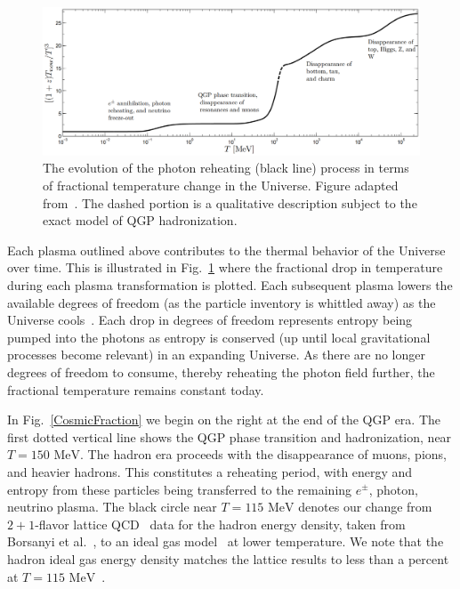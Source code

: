 \documentclass[universe,article,submit,moreauthors,pdftex,a4paper]{Definitions/mdpi}
\newcommand{\MeV}{\text{ MeV}}
\newcommand*{\rf}[1]{Fig.~{\ref{#1}}}
\begin{document}
\begin{figure}[ht]
 \centering
 \includegraphics[width=\textwidth]{./plots/degrees_of_freedom.PNG}
 \caption{The evolution of the photon reheating (black line) process in terms of fractional temperature change in the Universe. Figure adapted from~\cite{Rafelski:2013yka}. The dashed portion is a qualitative description subject to the exact model of QGP hadronization.}
 \label{degrees_of_freedom} 
\end{figure}

Each plasma outlined above contributes to the thermal behavior of the Universe over time. This is illustrated in \rf{degrees_of_freedom} where the fractional drop in temperature during each plasma transformation is plotted. Each subsequent plasma lowers the available degrees of freedom (as the particle inventory is whittled away) as the Universe cools~\cite{Wantz:2009it,Rafelski:2013yka}. Each drop in degrees of freedom represents entropy being pumped into the photons as entropy is conserved (up until local gravitational processes become relevant) in an expanding Universe. As there are no longer degrees of freedom to consume, thereby reheating the photon field further, the fractional temperature remains constant today.

In \rf{CosmicFraction} we begin on the right at the end of the QGP era. The first dotted vertical line shows the QGP phase transition and hadronization, near $T=150\MeV$. The hadron era proceeds with the disappearance of muons, pions, and heavier hadrons. This constitutes a reheating period, with energy and entropy from these particles being transferred to the remaining $e^\pm$, photon, neutrino plasma. The black circle near $T=115\MeV$ denotes our change from $2+1$-flavor lattice QCD~\cite{Kronfeld:2012ym, DElia:2012ifm, Bonati:2013hsa} data for the hadron energy density, taken from Borsanyi et al.~\cite{Borsanyi:2012rr,Borsanyi:2013bia}, to an ideal gas model~\cite{Bernstein:1988bw} at lower temperature. We note that the hadron ideal gas energy density matches the lattice results to less than a percent at $T=115\MeV$~\cite{Philipsen:2012nu}. 
\end{document}
